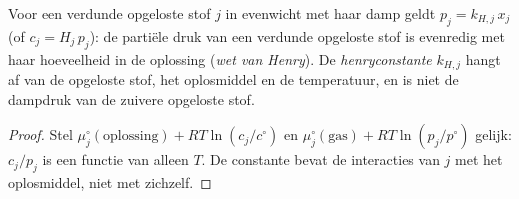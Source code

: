 \begin{proposition}\label{prop:b2:chemical-potential:henry}
Voor een verdunde opgeloste stof $j$ in evenwicht met haar damp geldt $p_j = k_{H,j}\,x_j$
(of $c_j = H_j\,p_j$): de partiële druk van een verdunde opgeloste stof is
evenredig met haar hoeveelheid in de oplossing (\emph{wet van
Henry}). De \emph{henryconstante}
$k_{H,j}$ hangt af van de opgeloste stof, het oplosmiddel en de temperatuur, en is niet
de dampdruk van de zuivere opgeloste stof.
\end{proposition}

\begin{proof}
Stel $\mu_j^\circ(\text{oplossing}) + RT\ln(c_j/c^\circ)$ en
$\mu_j^\circ(\text{gas}) + RT\ln(p_j/p^\circ)$ gelijk: $c_j/p_j$ is een functie van alleen
$T$. De constante bevat de interacties van $j$ met het oplosmiddel, niet
met zichzelf.
\end{proof}

